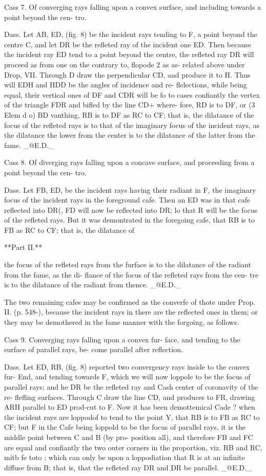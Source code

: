 \documentclass{article}
\begin{document}
Cass 7. Of converging rays falling upon a convex surface, and including towards a point beyond the cen- tro.

Dass. Let AB, ED, (fig. 8) be the incident rays tending to F, a point beyond the centre C, and let DR be the refleted ray of the incident one ED. Then because the incident ray ED tend to a point beyond the centre, the refleted ray DR will proceed as from one on the contrary to, flopode 2 as as- related above under Drop, VII. Through D draw the perpendicular CD, and produce it to H. Thus will EDH and HDD be the angles of incidence and re- flelections, while being equal, their vertical ones of DF and CDR will be fo to cases confiantly the vertex of the triangle FDR and bifled by the line CD+ where- fore, RD is to DF, or (3 Elem d o) BD vanthing, RB is to DF as RC to CF; that is, the dilatance of the focus of the refleted rays is to that of the imaginary focus of the incident rays, as the dilatance the lower from the center is to the dilatance of the latter from the fame. \_@E.D.\_

Cass 8. Of diverging rays falling upon a concave surface, and proceeding from a point beyond the cen- tro.

Dass. Let FB, ED, be the incident rays having their radiant in F, the imaginary focus of the incident rays in the foreground cafe. Then an ED was in that cafe reflected into DR(, FD will now be reflected into DR; lo that R will be the focus of the refleted rays. But it was demontrated in the foregoing cafe, that RB is to FB as RC to CF; that is, the dilatance of

**Part II.**

the focus of the refleted rays from the furface is to the dilatance of the radiant from the fame, as the di- flance of the focus of the refleted rays from the cen- tre is to the dilatance of the radiant from thence. \_@E.D.\_

The two remaining cafes may be confirmed as the converfe of thote under Prop. II. (p. 548-), because the incident rays in there are the reflected ones in them; or they may be demothered in the fame manner with the forgoing, as follows.

Cass 9. Converging rays falling upon a convex fur- face, and tending to the surface of parallel rays, be- come parallel after reflection.

Dass. Let ED, RB, (fig. 8) reported two convergency rays inside to the convex fur- End, and tending towards F, which we will now loppole to be the focus of parallel rays; and he DR be the refleted ray and Cash center of coronavity of the re- flefling surfaces. Through C draw the line CD, and produces to FR, drawing ARH parallel to ED prod-cut to F. Now it has been demottemical Cade ? when the incident rays are loppodof to tend to the point Y, that RB is to FB as RC to CF; but F in the Cafe being loppold to be the focus of parallel rays, it is the middle point between C and B (by pro- position all), and therefore FB and FC are equal and confiantly the two outer corners in the proportion, viz. RB and RC, mitb fe toto ; which can only be upon a loppodiation that R is at an infinite diffuse from B; that is, that the refleted ray DR and DR be parallel. \_@E.D.\_
\end{document}
